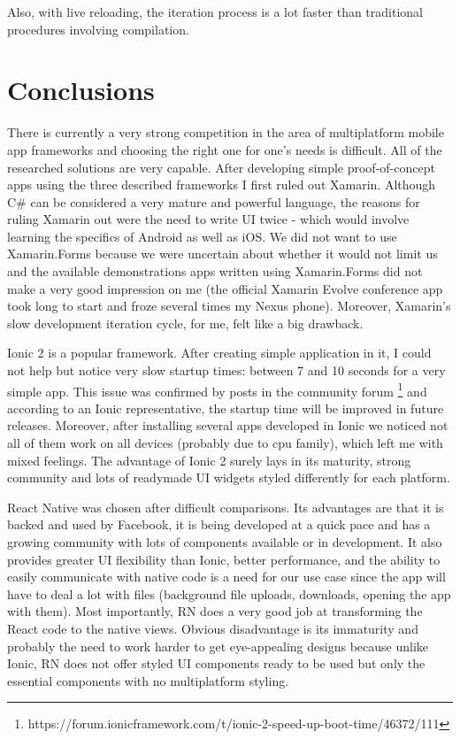 Also, with live reloading, the iteration process is a lot faster than traditional procedures involving compilation.


\section{Conclusions}

There is currently a very strong competition in the area of multiplatform mobile app frameworks and choosing the right one for one's needs is difficult. All of the researched solutions are very capable. 
After developing simple proof-of-concept apps using the three described frameworks I first ruled out Xamarin. Although C\# can be considered a very mature and powerful language, the reasons for ruling Xamarin out were the need to write UI twice - which would involve learning the specifics of Android as well as iOS. We did not want to use Xamarin.Forms because we were uncertain about whether it would not limit us and the available demonstrations apps written using Xamarin.Forms did not make a very good impression on me (the official Xamarin Evolve conference app took long to start and froze several times my Nexus phone). Moreover, Xamarin's slow development iteration cycle, for me, felt like a big drawback.

Ionic 2 is a popular framework. After creating simple application in it, I could not help but notice very slow startup times: between 7 and 10 seconds for a very simple app. This issue was confirmed by posts in the community forum \footnote{https://forum.ionicframework.com/t/ionic-2-speed-up-boot-time/46372/111} and according to an Ionic representative, the startup time will be improved in future releases. Moreover, after installing several apps developed in Ionic we noticed not all of them work on all devices (probably due to cpu family), which left me with mixed feelings. The advantage of Ionic 2 surely lays in its maturity, strong community and lots of readymade UI widgets styled differently for each platform.

React Native was chosen after difficult comparisons. Its advantages are that it is backed and used by Facebook, it is being developed at a quick pace and has a growing community with lots of components available or in development. It also provides greater UI flexibility than Ionic, better performance, and the ability to easily communicate with native code is a need for our use case since the app will have to deal a lot with files (background file uploads, downloads, opening the app with them). Most importantly, RN does a very good job at transforming the React code to the native views. Obvious disadvantage is its immaturity and probably the need to work harder to get eye-appealing designs because unlike Ionic, RN does not offer styled UI components ready to be used but only the essential components with no multiplatform styling. 

